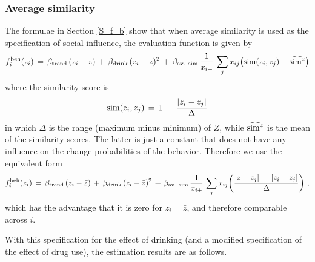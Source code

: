 \documentclass[a4paper,fleqn,11pt]{article}
\newcommand{\+}{\, + \,}
\begin{document}
\subsubsection{Average similarity}

The formulae in Section \ref{S_f_b} show that when average similarity is used
as the specification of social influence, the evaluation function is given by
\begin{equation}
   f^{\rm beh}_i(z_i) \,=\, \beta_{\rm trend} \, (z_i - \bar z)
               \,+\, \beta_{\rm drink} \, (z_i - \bar z)^2 \,+\,
                 \beta_{\rm av.\ sim}\,  \frac{1}{x_{i+}} \,
          \sum_j x_{ij} \big({\rm sim}(z_i, z_j) - \widehat{{\rm sim}^z}\big)
                    \label{eq_f_b10}
\end{equation}
where the similarity score is
\[
 {\rm sim}(z_i, z_j) \,=\, 1 \,-\, \frac{ \vert z_i - z_j \vert}{\Delta}
\]
in which $\Delta$ is the range (maximum minus minimum) of $Z$,
while $\widehat{{\rm sim}^z}$ is the mean of the similarity scores.
The latter is just a constant that does not have any influence on
the change probabilities of the behavior. Therefore we
use the equivalent form
\begin{equation}
   f^{\rm beh}_i(z_i) \,=\, \beta_{\rm trend} \, (z_i - \bar z)
               \,+\, \beta_{\rm drink} \, (z_i - \bar z)^2 \,+\,
                 \beta_{\rm av.\ sim}\,  \frac{1}{x_{i+}} \,
          \sum_j x_{ij} \bigg(
          \frac{ \vert \bar z - z_j \vert \,-\, \vert z_i - z_j \vert}{\Delta}
          \bigg) \ ,                    \label{eq_f_b1}
\end{equation}
which has the advantage that it is zero for $z_i = \bar z$,
and therefore comparable across $i$.

With this specification for the effect of drinking
(and a modified specification of the effect of drug use), the estimation
results are as follows.
\medskip
\end{document}
